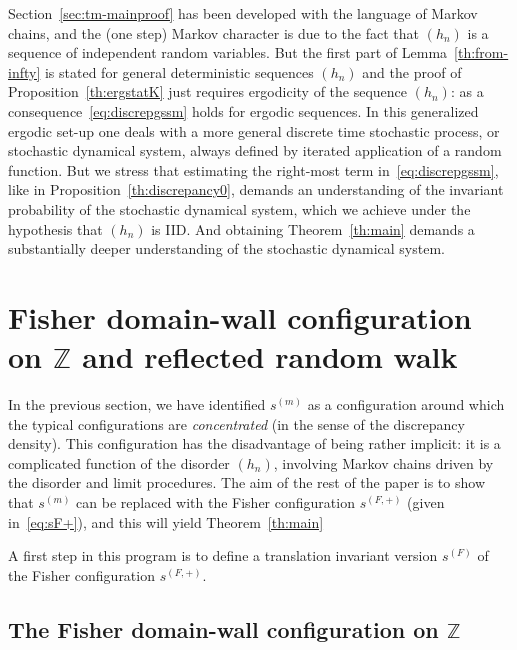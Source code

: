 \documentclass[AHL,Unicode,longabstracts,published]{cedram}
\newcommand{\bbZ}{\mathbb{Z}}
\begin{document}
\begin{rema}\label{rem:gen-erg}
Section~\ref{sec:tm-mainproof} has been developed with the language of Markov chains, and the (one step) Markov character is due to the fact that $(h_n)$ is a sequence of independent random variables. But the first part of Lemma~\ref{th:from-infty} is stated for general deterministic sequences $(h_n)$ and the proof of Proposition~\ref{th:ergstatK} just requires ergodicity of the sequence $(h_n)$: as a consequence~\eqref{eq:discrepgssm} holds for ergodic sequences. In this generalized ergodic set-up one deals with a more general discrete time stochastic process, or stochastic dynamical system, always defined by iterated application of a random function. But we stress that estimating the right-most term in~\eqref{eq:discrepgssm}, like in Proposition~\ref{th:discrepancy0}, demands an understanding of the invariant probability of the stochastic dynamical system, which we achieve under the hypothesis that $(h_n)$ is IID. And obtaining Theorem~\ref{th:main} demands a substantially deeper understanding of the stochastic dynamical system.
\end{rema}


\section{Fisher domain-wall configuration on \texorpdfstring{$\bbZ$}{bbZ} and reflected random walk}\label{sec:auxiliary}


In the previous section, we have identified $s^{(m)}$ as a configuration around which the typical configurations are \emph{concentrated} (in the sense of the discrepancy density). This configuration has the disadvantage of being rather implicit: it is a complicated function of the disorder $(h_n)$, involving Markov chains driven by the disorder and limit procedures. The aim of the rest of the paper is to show that $s^{(m)}$ can be replaced with the Fisher configuration $s^{(F, +)}$ (given in~\eqref{eq:sF+}), and this will yield Theorem~\ref{th:main}

A first step in this program is to define a translation invariant version $s^{(F)}$ of the Fisher configuration $s^{(F, +)}$.

\subsection{The Fisher domain-wall configuration on \texorpdfstring{$\bbZ$}{bbZ}}\label{sec:Fisher-Z}
\end{document}
